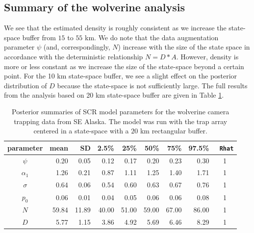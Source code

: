 \subsection{Summary of the wolverine analysis}

We see that the estimated density is roughly consistent as we increase
the state-space buffer from $15$ to $55$ km. We do note that the data
augmentation parameter $\psi$ (and, correspondingly, $N$) increase with
the size of the state space in accordance with the deterministic
relationship $N= D*A$. However, density is more or less constant as we
increase the size of the state-space beyond a certain point.  For the
10 km state-space buffer, we see a slight effect on the posterior
distribution of $D$ because the state-space is not sufficiently large.
The full results from the analysis based on 20 km state-space buffer
are given in Table \ref{scr0.tab.wolverine-results2}.

\begin{table}
\centering
\caption{
Posterior summaries of SCR model parameters for the wolverine camera
trapping data from SE Alaska. The model was run with the trap array
centered in a state-space with a $20$ km
rectangular buffer.
}
\begin{tabular}{crrrrrrrc}
\hline \hline
parameter & mean & SD & 2.5\% & 25\% & 50\% & 75\% & 97.5\% &\mbox{\tt
  Rhat}  \\
\hline
$\psi$  &      0.20&  0.05&   0.12&   0.17&   0.20&   0.23&   0.30 &   1 \\
$\alpha_1$ &     1.26&  0.21&   0.87&   1.11&   1.25&   1.40&   1.71 &   1 \\
$\sigma$&      0.64&  0.06&   0.54&   0.60&   0.63&   0.67&   0.76 &   1 \\
$p_0$   &      0.06&  0.01&   0.04&   0.05&   0.06&   0.06&   0.08 &   1 \\
$N$    &     59.84& 11.89&  40.00&  51.00&  59.00&  67.00&  86.00 &   1 \\
$D$    &      5.77&  1.15&   3.86&   4.92&   5.69&   6.46&   8.29 &
1 \\ \hline
\end{tabular}
\label{scr0.tab.wolverine-results2}
\end{table}

